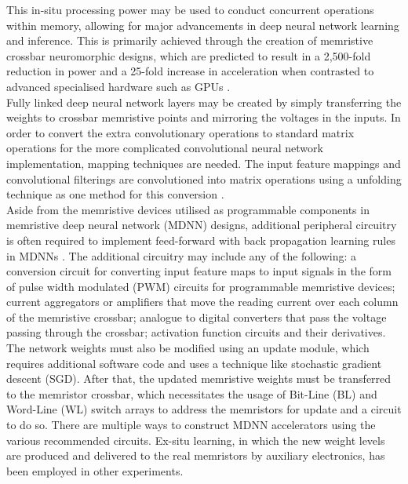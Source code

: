 \noindent This in-situ processing power may be used to conduct concurrent operations within memory, allowing for major advancements in deep neural network learning and inference. This is primarily achieved through the creation of memristive crossbar neuromorphic designs, which are predicted to result in a 2,500-fold reduction in power and a 25-fold increase in acceleration when contrasted to advanced specialised hardware such as GPUs \cite{eshraghian2019analog}. \\

\noindent Fully linked deep neural network layers may be created by simply transferring the weights to crossbar memristive points and mirroring the voltages in the inputs. In order to convert the extra convolutionary operations to standard matrix operations for the more complicated convolutional neural network implementation, mapping techniques are needed. The input feature mappings and convolutional filterings are convolutioned into matrix operations using a unfolding technique as one method for this conversion \cite{lammie2022memtorch}. \\

\noindent Aside from the memristive devices utilised as programmable components in memristive deep neural network (MDNN) designs, additional peripheral circuitry is often required to implement feed-forward with back propagation learning rules in MDNNs \cite{krestinskaya2018learning}. The additional circuitry may include any of the following: a conversion circuit for converting input feature maps to input signals in the form of pulse width modulated (PWM) circuits for programmable memristive devices; current aggregators or amplifiers that move the reading current over each column of the memristive crossbar; analogue to digital converters that pass the voltage passing through the crossbar; activation function circuits and their derivatives. \\

\noindent The network weights must also be modified using an update module, which requires additional software code and uses a technique like stochastic gradient descent (SGD). After that, the updated memristive weights must be transferred to the memristor crossbar, which necessitates the usage of Bit-Line (BL) and Word-Line (WL) switch arrays to address the memristors for update and a circuit to do so. There are multiple ways to construct MDNN accelerators using the various recommended circuits. Ex-situ learning, in which the new weight levels are produced and delivered to the real memristors by auxiliary electronics, has been employed in other experiments. \\

